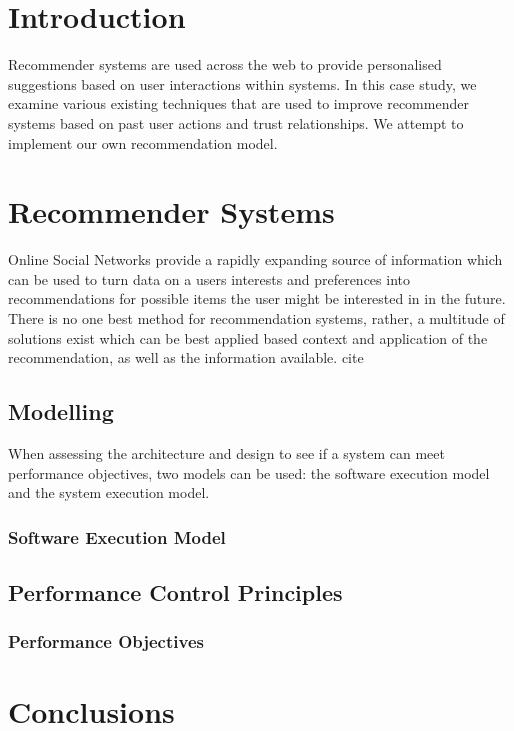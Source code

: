 \documentclass[a4paper,11pt,article,oneside]{memoir}
\begin{document}
	
	\tableofcontents
	\chapter{Introduction}
	Recommender systems are used across the web to provide personalised suggestions based on user interactions within systems. In this case study, we examine various existing techniques that are used to improve recommender systems based on past user actions and trust relationships. We attempt to implement our own recommendation model.
	
	
	\newpage
	\chapter{Recommender Systems}
	
	
	Online Social Networks provide a rapidly expanding source of information which can be used to turn data on a users interests and preferences into recommendations for possible items the user might be interested in in the future. There is no one best method for recommendation systems, rather, a multitude of solutions exist which can be best applied based context and application of the recommendation, as well as the information available. {cite}
	
	\section{Modelling}
	When assessing the architecture and design to see if a system can meet performance objectives, two models can be used: the software execution model and the system execution model. 
	\subsection{Software Execution Model} 
	
	\section{Performance Control Principles}
	
	\subsection{Performance Objectives}

	\chapter{Conclusions}
	\newpage
	\nocite{*}
	
\end{document}
